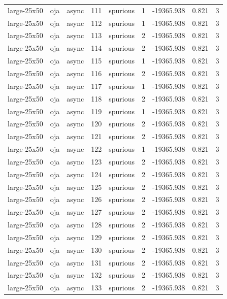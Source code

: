 \begin{tabular}{lllrlrrrr}
large-25x50 & oja & async & 111 & spurious & 1 & -19365.938 & 0.821 & 3 \\
large-25x50 & oja & async & 112 & spurious & 1 & -19365.938 & 0.821 & 3 \\
large-25x50 & oja & async & 113 & spurious & 2 & -19365.938 & 0.821 & 3 \\
large-25x50 & oja & async & 114 & spurious & 2 & -19365.938 & 0.821 & 3 \\
large-25x50 & oja & async & 115 & spurious & 1 & -19365.938 & 0.821 & 3 \\
large-25x50 & oja & async & 116 & spurious & 2 & -19365.938 & 0.821 & 3 \\
large-25x50 & oja & async & 117 & spurious & 1 & -19365.938 & 0.821 & 3 \\
large-25x50 & oja & async & 118 & spurious & 2 & -19365.938 & 0.821 & 3 \\
large-25x50 & oja & async & 119 & spurious & 1 & -19365.938 & 0.821 & 3 \\
large-25x50 & oja & async & 120 & spurious & 2 & -19365.938 & 0.821 & 3 \\
large-25x50 & oja & async & 121 & spurious & 2 & -19365.938 & 0.821 & 3 \\
large-25x50 & oja & async & 122 & spurious & 1 & -19365.938 & 0.821 & 3 \\
large-25x50 & oja & async & 123 & spurious & 2 & -19365.938 & 0.821 & 3 \\
large-25x50 & oja & async & 124 & spurious & 2 & -19365.938 & 0.821 & 3 \\
large-25x50 & oja & async & 125 & spurious & 2 & -19365.938 & 0.821 & 3 \\
large-25x50 & oja & async & 126 & spurious & 2 & -19365.938 & 0.821 & 3 \\
large-25x50 & oja & async & 127 & spurious & 2 & -19365.938 & 0.821 & 3 \\
large-25x50 & oja & async & 128 & spurious & 2 & -19365.938 & 0.821 & 3 \\
large-25x50 & oja & async & 129 & spurious & 2 & -19365.938 & 0.821 & 3 \\
large-25x50 & oja & async & 130 & spurious & 2 & -19365.938 & 0.821 & 3 \\
large-25x50 & oja & async & 131 & spurious & 2 & -19365.938 & 0.821 & 3 \\
large-25x50 & oja & async & 132 & spurious & 2 & -19365.938 & 0.821 & 3 \\
large-25x50 & oja & async & 133 & spurious & 2 & -19365.938 & 0.821 & 3 \\

\end{tabular}
